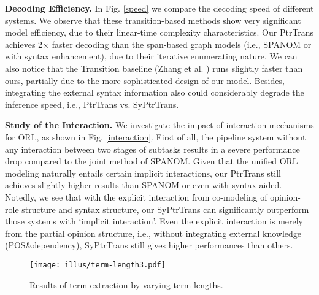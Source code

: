 \documentclass[letterpaper]{article} \usepackage{aaai22}  \usepackage{times}  \usepackage{helvet}  \usepackage{courier}  \usepackage[hyphens]{url}  \usepackage{graphicx} \urlstyle{rm} \def\UrlFont{\rm}  \usepackage{natbib}  \usepackage{caption} \DeclareCaptionStyle{ruled}{labelfont=normalfont,labelsep=colon,strut=off} \frenchspacing  \setlength{\pdfpagewidth}{8.5in}  \setlength{\pdfpageheight}{11in}  \usepackage{algorithm}
\begin{document}
\noindent\textbf{Decoding Efficiency.}
In Fig. \ref{speed} we compare the decoding speed of different systems.
We observe that these transition-based methods show very significant model efficiency, due to their linear-time complexity characteristics.
Our PtrTrans achieves 2$\times$ faster decoding than the span-based graph models (i.e., S{\small PAN}OM or with syntax enhancement), due to their iterative enumerating nature.
We can also notice that the Transition baseline (Zhang et al. \citeyear{ZhangWF19}) runs slightly faster than ours, partially due to the more sophisticated design of our model.
Besides, integrating the external syntax information also could considerably degrade the inference speed, i.e., PtrTrans vs. SyPtrTrans.
















\noindent\textbf{Study of the Interaction.}
We investigate the impact of interaction mechanisms for ORL, as shown in Fig. \ref{interaction}.
First of all, the pipeline system without any interaction between two stages of subtasks results in a severe performance drop compared to the joint method of S{\small PAN}OM.
Given that the unified ORL modeling naturally entails certain implicit interactions, our PtrTrans still achieves slightly higher results than S{\small PAN}OM or even with syntax aided.
Notedly, we see that with the explicit interaction from co-modeling of opinion-role structure and syntax structure, our SyPtrTrans can significantly outperform those systems with `implicit interaction'.
Even the explicit interaction is merely from the partial opinion structure, i.e., without integrating external knowledge (POS\&dependency), SyPtrTrans still gives higher performances than others.










\begin{figure}[!t]
\centering
\texttt{[image: illus/term-length3.pdf]}
\caption{
Results of term extraction by varying term lengths.
}
\label{span-length}
\end{figure}
\end{document}
